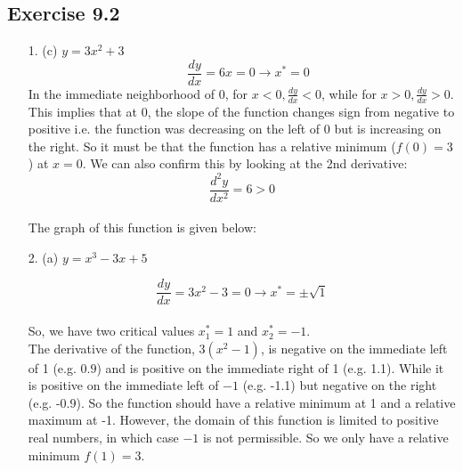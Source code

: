 \documentclass{./../../Latex/homework}
\begin{document}
\thispagestyle{plain}
\newcommand{\mytitle}{Homework 8 Solutions}
\myheader{\mytitle}

\subsection*{Exercise 9.2} 

\begin{enumerate}
\item[1.] (c) $y=3 x^{2}+3$
$$ \quad \frac{d y}{d x}=6 x=0 \rightarrow x^{*}=0 $$
In the immediate neighborhood of $0$, for $x<0, \frac{d y}{d x}<0$, while for $x>0, \frac{d y}{d x}>0$. This implies that at $0$, the slope of the function changes sign from negative to positive i.e. the function was decreasing on the left of 0 but is increasing on the right. So it must be that the function has a relative minimum ($f(0)=3$) at $x=0$. We can also confirm this by looking at the 2nd derivative: $$\frac{d^{2} y}{d x^{2}}=6>0$$ \\
The graph of this function is given below: \\

\begin{center}
\end{center}

\newpage
\item[2.] 
 (a) $y=x^{3}-3 x+5$

$$\frac{d y}{d x}=3 x^{2}-3=0 \rightarrow x^{*}= \pm \sqrt{1}$$ \\
So, we have two critical values $x_{1}^{*}=1$ and $x_{2}^{*}=-1$. \\

The derivative of the function, $3\left(x^{2}-1\right)$, is negative on the immediate left of 1 (e.g. $0.9$) and is positive on the immediate right of 1 (e.g. 1.1). While it is positive on the immediate left of $-1$ (e.g. -1.1) but negative on the right (e.g. -0.9). So the function should have a relative minimum at 1 and a relative maximum at -1. However, the domain of this function is limited to positive real numbers, in which case $-1$ is not permissible. So we only have a relative minimum $f(1)=3$.  \\


\end{enumerate}
\end{document}
